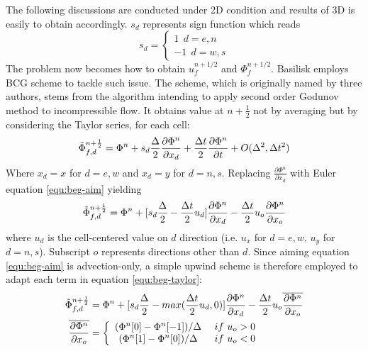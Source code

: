 The following discussions are conducted under 2D condition and results of 3D is easily to obtain accordingly. $s_d$ represents sign function which reads
\begin{equation}
    s_d = 
    \left\{
    \begin{array}{cc}
    1\ \ d=e,n \\
    -1\ \ d=w,s
    \end{array}
    \right.
\end{equation}
The problem now becomes how to obtain $u_f^{n+1/2}$ and $\Phi_f^{n+1/2}$. Basilisk employs BCG scheme to tackle such issue. The scheme, which is originally named by three authors\cite{1989_Bell}, stems from the algorithm intending to apply second order Godunov method to incompressible flow. It obtains value at $n+\frac{1}{2}$ not by averaging but by considering the Taylor series, for each cell:
\begin{equation}
  \Tilde{\Phi}^{n+ \frac{1}{2}}_{f,d} = \Phi^n+ s_d\frac{\Delta}{2} \frac{\partial \Phi^n}{\partial x_d} + \frac{\Delta t}{2} \frac{\partial \Phi^n}{\partial t} + O(\Delta^2,\Delta t^2)
\end{equation}
Where $x_d=x$ for $d = e,w$ and $x_d=y$ for $d = n,s$. Replacing $ \frac{\partial \Phi^n}{\partial x_d}$ with Euler equation \ref{equ:beg-aim} yielding 
\begin{equation}
  \Tilde{\Phi}^{n+ \frac{1}{2}}_{f,d} = \Phi^n + [s_d \frac{\Delta}{2}- \frac{\Delta t}{2} u_d] \frac{\partial \Phi^n}{\partial x_d} - \frac{\Delta t}{2} u_o \frac{\partial \Phi^n}{\partial x_o}\label{equ:beg-taylor}
\end{equation}
where $u_d$ is the cell-centered value on $d$ direction (i.e. $u_x$ for $d = e,w$, $u_y$ for $d = n,s$). Subscript $o$ represents directions other than $d$.
Since aiming equation \ref{equ:beg-aim} is advection-only, a simple upwind scheme is therefore employed\cite{2000_Martin,1998_Martin} to adapt each term in equation \ref{equ:beg-taylor}:
\begin{align}
  \Tilde{\Phi}^{n+ \frac{1}{2}}_{f,d} &= \Phi^n + [s_d \frac{\Delta}{2}- max(\frac{\Delta t}{2} u_d,0)] \frac{\partial \Phi^n}{\partial x_d} - \frac{\Delta t}{2} u_o \overline{\frac{\partial \Phi^n}{\partial x_o}}\label{equ:beg-upwind} \\
  \overline{\frac{\partial \Phi^n}{\partial x_o}} &= \left\{
  \begin{array}{cc}
       (\Phi^n[0] - \Phi^n[-1])/\Delta&\ if\ u_o>0 \\
       (\Phi^n[1] - \Phi^n[0])/\Delta&\ if\ u_o<0
  \end{array}
  \right.\label{equ:beg-upwind2}
\end{align}
